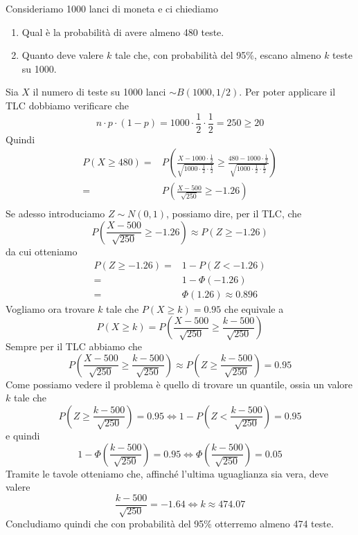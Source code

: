\begin{example}
	Consideriamo 1000 lanci di moneta e ci chiediamo
	\begin{enumerate}
		\item Qual è la probabilità di avere almeno 480 teste.
		\item Quanto deve valere $k$ tale che, con probabilità del 95\%, escano almeno $k$ teste su
		      1000.
	\end{enumerate}
	Sia $X$ il numero di teste su 1000 lanci $\sim B(1000, 1/2)$. Per poter applicare il TLC
	dobbiamo verificare che
	\[ n \cdot p \cdot (1-p) = 1000 \cdot \frac{1}{2} \cdot \frac{1}{2} = 250 \geq 20 \]
	Quindi
	\begin{align*}
		P(X \geq 480) = & P \left( \frac{X - 1000 \cdot \frac{1}{2}}
		{\sqrt{1000 \cdot \frac{1}{2} \cdot \frac{1}{2}}} \geq
		\frac{480 - 1000 \cdot \frac{1}{2}}{\sqrt{1000 \cdot \frac{1}{2} \cdot \frac{1}{2}}}
		\right)                                                                  \\
		=               & P \left( \frac{X - 500}{\sqrt{250}} \geq -1.26 \right) \\
	\end{align*}
	Se adesso introduciamo $Z \sim N(0,1)$, possiamo dire, per il TLC, che
	\[
		P \left( \frac{X - 500}{\sqrt{250}}
		\geq -1.26 \right) \approx P(Z \geq -1.26)
	\]
	da cui otteniamo
	\begin{align*}
		P(Z \geq -1.26) = & 1 - P(Z < -1.26)         \\
		=                 & 1 - \Phi (-1.26)         \\
		=                 & \Phi(1.26) \approx 0.896
	\end{align*}
	Vogliamo ora trovare $k$ tale che $P(X \geq k) = 0.95$ che equivale a
	\[
		P(X \geq k) = P \left( \frac{X - 500}{\sqrt{250}} \geq \frac{k - 500}{\sqrt{250}} \right)
	\]
	Sempre per il TLC abbiamo che
	\[
		P \left( \frac{X - 500}{\sqrt{250}} \geq
		\frac{k - 500}{\sqrt{250}} \right) \approx
		P\left( Z \geq \frac{k - 500}{\sqrt{250}} \right) = 0.95
	\]
	Come possiamo vedere il problema è quello di trovare un quantile, ossia un valore $k$ tale che
	\[
		P \left( Z \geq \frac{k - 500}{\sqrt{250}} \right) = 0.95 \iff
		1 - P \left( Z < \frac{k - 500}{\sqrt{250}} \right) = 0.95
	\]
	e quindi
	\[
		1 - \Phi \left( \frac{k - 500}{\sqrt{250}} \right) = 0.95 \iff
		\Phi \left( \frac{k - 500}{\sqrt{250}} \right) = 0.05
	\]
	Tramite le tavole otteniamo che, affinché l'ultima uguaglianza sia vera, deve valere
	\[ \frac{k - 500}{\sqrt{250}} = -1.64 \iff k \approx 474.07 \]
	Concludiamo quindi che con probabilità del 95\% otterremo almeno 474 teste.
\end{example}

